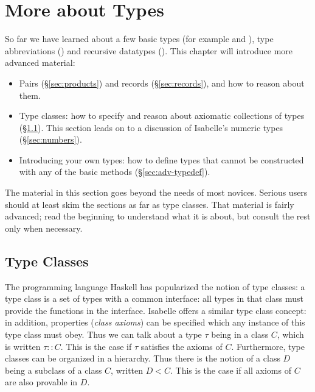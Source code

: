 \chapter{More about Types}
\label{ch:more-types}

So far we have learned about a few basic types (for example  and
), type abbreviations () and recursive datatypes
(). This chapter will introduce more
advanced material:
\begin{itemize}
\item Pairs ({\S}\ref{sec:products}) and records ({\S}\ref{sec:records}),
and how to reason about them.
\item Type classes: how to specify and reason about axiomatic collections of
  types ({\S}\ref{sec:axclass}). This section leads on to a discussion of
  Isabelle's numeric types ({\S}\ref{sec:numbers}).  
\item Introducing your own types: how to define types that
  cannot be constructed with any of the basic methods
  ({\S}\ref{sec:adv-typedef}).
\end{itemize}

The material in this section goes beyond the needs of most novices.
Serious users should at least skim the sections as far as type classes.
That material is fairly advanced; read the beginning to understand what it
is about, but consult the rest only when necessary.




\section{Type Classes} %
\label{sec:axclass}

The programming language Haskell has popularized the notion of type
classes: a type class is a set of types with a
common interface: all types in that class must provide the functions
in the interface.  Isabelle offers a similar type class concept: in
addition, properties (\emph{class axioms}) can be specified which any
instance of this type class must obey.  Thus we can talk about a type
$\tau$ being in a class $C$, which is written $\tau :: C$.  This is the case
if $\tau$ satisfies the axioms of $C$. Furthermore, type classes can be
organized in a hierarchy.  Thus there is the notion of a class $D$
being a subclass of a class $C$, written $D
< C$. This is the case if all axioms of $C$ are also provable in $D$.

